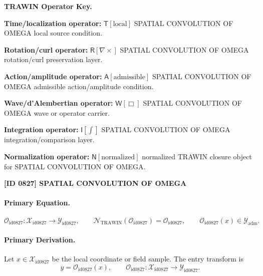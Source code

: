 \par\vspace{0.45\baselineskip}
\noindent\begin{minipage}[t]{\linewidth}
\begingroup
\small
\raggedright
\textbf{TRAWIN Operator Key.}\par
\noindent\textbf{Time/localization operator:} $\mathsf{T}\!\left[\mathrm{local}\right]$ SPATIAL CONVOLUTION OF OMEGA local source condition.\par
\noindent\textbf{Rotation/curl operator:} $\mathsf{R}\!\left[\nabla\times\right]$ SPATIAL CONVOLUTION OF OMEGA rotation/curl preservation layer.\par
\noindent\textbf{Action/amplitude operator:} $\mathsf{A}\!\left[\mathrm{admissible}\right]$ SPATIAL CONVOLUTION OF OMEGA admissible action/amplitude condition.\par
\noindent\textbf{Wave/d'Alembertian operator:} $\mathsf{W}\!\left[\Box\right]$ SPATIAL CONVOLUTION OF OMEGA wave or operator carrier.\par
\noindent\textbf{Integration operator:} $\mathsf{I}\!\left[\int\right]$ SPATIAL CONVOLUTION OF OMEGA integration/comparison layer.\par
\noindent\textbf{Normalization operator:} $\mathsf{N}\!\left[\mathrm{normalized}\right]$ normalized TRAWIN closure object for SPATIAL CONVOLUTION OF OMEGA.\par
\endgroup
\end{minipage}

\clearpage
\noindent\textbf{[ID 0827] SPATIAL CONVOLUTION OF OMEGA}\par
\vspace{0.35em}
\paragraph{Primary Equation.}
\[
\mathcal{O}_{\mathrm{id0827}}:\mathcal{X}_{\mathrm{id0827}}\longrightarrow \mathcal{Y}_{\mathrm{id0827}},\qquad
\mathcal{N}_{\mathrm{TRAWIN}}(\mathcal{O}_{\mathrm{id0827}})=\mathcal{O}_{\mathrm{id0827}},\qquad
\mathcal{O}_{\mathrm{id0827}}(x)\in\mathcal{Y}_{\mathrm{adm}}.
\]

\paragraph{Primary Derivation.} Let $x\in \mathcal{X}_{\mathrm{id0827}}$ be the local coordinate or field sample.  The entry transform is\[
y=\mathcal{O}_{\mathrm{id0827}}(x),\qquad \mathcal{O}_{\mathrm{id0827}}:\mathcal{X}_{\mathrm{id0827}}\longrightarrow \mathcal{Y}_{\mathrm{id0827}}.
\]

